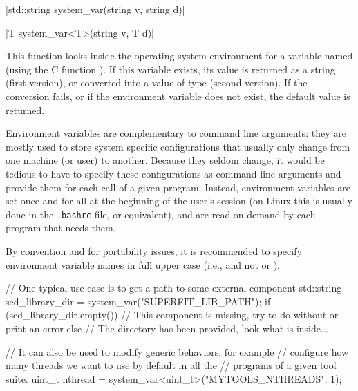 \funcitem \cppinline|std::string system_var(string v, string d)| 

\cppinline|T system_var<T>(string v, T d)| 

This function looks inside the operating system environment for a variable named  (using the C function ). If this variable exists, its value is returned as a string (first version), or converted into a value of type  (second version). If the conversion fails, or if the environment variable does not exist, the default value  is returned.

Environment variables are complementary to command line arguments: they are mostly used to store system specific configurations that usually only change from one machine (or user) to another. Because they seldom change, it would be tedious to have to specify these configurations as command line arguments and provide them for each call of a given program. Instead, environment variables are set once and for all at the beginning of the user's session (on Linux this is usually done in the \texttt{.bashrc} file, or equivalent), and are read on demand by each program that needs them.

By convention and for portability issues, it is recommended to specify environment variable names in full upper case (i.e.,  and not  or ).

\begin{example}
\begin{cppcode}
// One typical use case is to get a path to some external component
std::string sed_library_dir = system_var("SUPERFIT_LIB_PATH");
if (sed_library_dir.empty()) {
    // This component is missing, try to do without or print an error
} else {
    // The directory has been provided, look what is inside...
}

// It can also be used to modify generic behaviors, for example
// configure how many threads we want to use by default in all the
// programs of a given tool suite.
uint_t nthread = system_var<uint_t>("MYTOOLS_NTHREADS", 1);
\end{cppcode}
\end{example}
